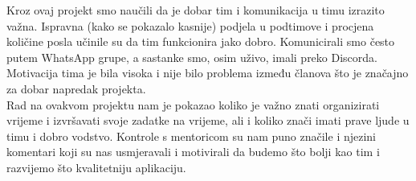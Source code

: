 Kroz ovaj projekt smo naučili da je dobar tim i komunikacija u timu izrazito važna. Ispravna (kako se pokazalo kasnije) podjela u podtimove i procjena količine posla učinile su da tim funkcionira jako dobro. Komunicirali smo često putem WhatsApp grupe, a sastanke smo, osim uživo, imali preko Discorda. Motivacija tima je bila visoka i nije bilo problema između članova što je značajno za dobar napredak projekta. \\
Rad na ovakvom projektu nam je pokazao koliko je važno znati organizirati vrijeme i izvršavati svoje zadatke na vrijeme, ali i koliko znači imati prave ljude u timu i dobro vodstvo. Kontrole s mentoricom su nam puno značile i njezini komentari koji su nas usmjeravali i motivirali da budemo što bolji kao tim i razvijemo što kvalitetniju aplikaciju. \\
  
     

		
		
		\eject 